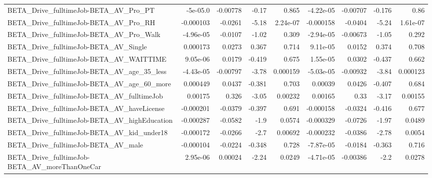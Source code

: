\begin{tabular}{lrrrrrrrr}
BETA\_Drive\_fulltimeJob-BETA\_AV\_Pro\_PT              &    -5e-05.0 &     -0.00778 &     -0.17 &    0.865 &  -4.22e-05 &    -0.00707 &       -0.176 &          0.86 \\
BETA\_Drive\_fulltimeJob-BETA\_AV\_Pro\_RH              &   -0.000103 &      -0.0261 &     -5.18 & 2.24e-07 &  -0.000158 &     -0.0404 &        -5.24 &      1.61e-07 \\
BETA\_Drive\_fulltimeJob-BETA\_AV\_Pro\_Walk            &   -4.96e-05 &      -0.0107 &     -1.02 &    0.309 &  -2.94e-05 &    -0.00673 &        -1.05 &         0.292 \\
BETA\_Drive\_fulltimeJob-BETA\_AV\_Single              &    0.000173 &       0.0273 &     0.367 &    0.714 &   9.11e-05 &      0.0152 &        0.374 &         0.708 \\
BETA\_Drive\_fulltimeJob-BETA\_AV\_WAITTIME            &    9.05e-06 &       0.0179 &    -0.419 &    0.675 &   1.55e-05 &      0.0302 &       -0.437 &         0.662 \\
BETA\_Drive\_fulltimeJob-BETA\_AV\_age\_35\_less         &   -4.43e-05 &     -0.00797 &     -3.78 & 0.000159 &  -5.03e-05 &    -0.00932 &        -3.84 &      0.000123 \\
BETA\_Drive\_fulltimeJob-BETA\_AV\_age\_60\_more         &    0.000449 &       0.0437 &    -0.381 &    0.703 &    0.00039 &      0.0426 &       -0.407 &         0.684 \\
BETA\_Drive\_fulltimeJob-BETA\_AV\_fulltimeJob         &     0.00175 &        0.326 &     -3.05 &  0.00232 &    0.00165 &        0.33 &        -3.17 &       0.00155 \\
BETA\_Drive\_fulltimeJob-BETA\_AV\_haveLicense         &   -0.000201 &      -0.0379 &    -0.397 &    0.691 &  -0.000158 &     -0.0324 &       -0.416 &         0.677 \\
BETA\_Drive\_fulltimeJob-BETA\_AV\_highEducation       &   -0.000287 &      -0.0582 &      -1.9 &   0.0574 &  -0.000329 &     -0.0726 &        -1.97 &        0.0489 \\
BETA\_Drive\_fulltimeJob-BETA\_AV\_kid\_under18         &   -0.000172 &      -0.0266 &      -2.7 &  0.00692 &  -0.000232 &     -0.0386 &        -2.78 &        0.0054 \\
BETA\_Drive\_fulltimeJob-BETA\_AV\_male                &   -0.000104 &      -0.0224 &    -0.348 &    0.728 &  -7.87e-05 &     -0.0184 &       -0.363 &         0.716 \\
BETA\_Drive\_fulltimeJob-BETA\_AV\_moreThanOneCar      &    2.95e-06 &      0.00024 &     -2.24 &   0.0249 &  -4.71e-05 &    -0.00386 &         -2.2 &        0.0278 \\

\end{tabular}
